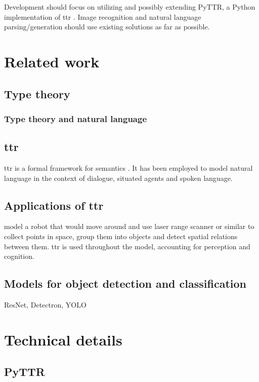 \documentclass[11pt,a4paper]{article}
\begin{document}
\noindent
Development should focus on utilizing and possibly extending PyTTR, a Python implementation of \gls{ttr} \citep{pyttr}. Image recognition and natural language parsing/generation should use existing solutions as far as possible.

\section{Related work}

\subsection{Type theory}

\subsubsection{Type theory and natural language}

\subsection{\gls{ttr}}

\gls{ttr} is a formal framework for semantics \citep{CooperRecordsRecordTypes2005}.
It has been employed to model natural language in the context of dialogue, situated agents and spoken language.

\subsection{Applications of \gls{ttr}}

\cite{DobnikModellinglanguageaction2012} model a robot that would move around and use laser range scanner or similar to collect points in space, group them into objects and detect spatial relations between them.
\Gls{ttr} is used throughout the model, accounting for perception and cognition.

\subsection{Models for object detection and classification}

ResNet, Detectron, YOLO

\section{Technical details}


\subsection{PyTTR}
\end{document}
